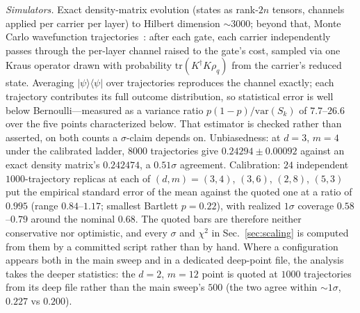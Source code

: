 \documentclass[aps,pra,reprint,superscriptaddress,nofootinbib,floatfix]{revtex4-2}
\begin{document}
\emph{Simulators.} Exact density-matrix evolution (states as rank-$2n$
tensors, channels applied per carrier per layer) to Hilbert dimension
${\sim}3000$; beyond that, Monte Carlo wavefunction
trajectories~\cite{dalibard1992,molmer1993}: after
each gate, each carrier independently passes through the per-layer
channel raised to the gate's cost, sampled via one Kraus operator drawn
with probability $\mathrm{tr}(K^\dagger K\rho_q)$ from the carrier's
reduced state. Averaging $\lvert\psi\rangle\langle\psi\rvert$ over
trajectories reproduces the channel exactly; each trajectory contributes
its full outcome distribution, so statistical error is well below
Bernoulli---measured as a variance ratio $p(1{-}p)/\mathrm{var}(S_k)$
of $7.7$--$26.6$ over the five points characterized below.
That estimator is checked rather than asserted, on both counts a
$\sigma$-claim depends on. Unbiasedness: at $d=3$, $m=4$ under the
calibrated ladder, $8000$ trajectories give $0.24294\pm0.00092$
against an exact density matrix's $0.242474$, a $0.51\sigma$
agreement. Calibration: $24$ independent $1000$-trajectory replicas at
each of $(d,m)=(3,4)$, $(3,6)$, $(2,8)$, $(5,3)$ put the empirical
standard error of the mean against the quoted one at a ratio of
$0.995$ (range $0.84$--$1.17$; smallest Bartlett $p=0.22$), with
realized $1\sigma$ coverage $0.58$--$0.79$ around the nominal $0.68$.
The quoted bars are therefore neither conservative nor optimistic, and
every $\sigma$ and $\chi^2$ in Sec.~\ref{sec:scaling} is computed from
them by a committed script rather than by hand. Where a configuration
appears both in the main sweep and in a dedicated deep-point file,
the analysis takes the deeper statistics: the $d{=}2$, $m{=}12$ point
is quoted at $1000$ trajectories from its deep file rather than the
main sweep's $500$ (the two agree within ${\sim}1\sigma$,
$0.227$ vs $0.200$).
\end{document}
